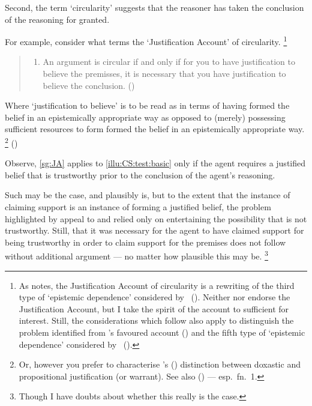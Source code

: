 \begin{note}
  Second, the term `circularity' suggests that the reasoner has taken the conclusion of the reasoning for granted.

  For example, consider what \citeauthor{Sgaravatti:2013wu} terms the `Justification Account' of circularity.\nolinebreak
  \footnote{
    As \citeauthor{Sgaravatti:2013wu} notes, the Justification Account of circularity is a rewriting of the third type of `epistemic dependence' considered by \citeauthor{Pryor:2004ws}~(\citeyear[359]{Pryor:2004ws}).
    Neither \citeauthor{Pryor:2004ws} nor \citeauthor{Sgaravatti:2013wu} endorse the Justification Account, but I take the spirit of the account to sufficient for interest.
    Still, the considerations which follow also apply to distinguish the {\color{red} problem identified} from \citeauthor{Sgaravatti:2013wu}'s favoured account (\Citeyear[\S3]{Sgaravatti:2013wu}) and the fifth type of `epistemic dependence' considered by \citeauthor{Pryor:2004ws}~(\citeyear[359]{Pryor:2004ws}).
  }

  \begin{quote}
    \begin{enumerate}[label=(JA), ref=(JA)]
    \item\label{sg:JA} An argument is circular if and only if for you to have justification to believe the premisses, it is necessary that you have justification to believe the conclusion.\nolinebreak
      \mbox{}\hfill\mbox{(\Citeyear[754]{Sgaravatti:2013wu})}
    \end{enumerate}
  \end{quote}
  Where `justification to believe' is to be read as in terms of having formed the belief in an epistemically appropriate way as opposed to (merely) possessing sufficient resources to form formed the belief in an epistemically appropriate way.\nolinebreak
  \footnote{
    Or, however you prefer to characterise \citeauthor{Firth:1978vi}'s (\Citeyear{Firth:1978vi}) distinction between doxastic and propositional justification (or warrant).
    See also \citeauthor{Silva:2020aa} (\Citeyear{Silva:2020aa}) --- esp.\ fn.\ 1.
  }
  (\citeauthor[Cf.][754--755]{Sgaravatti:2013wu})

  Observe, \ref{sg:JA} applies to \autoref{illu:CS:test:basic} only if the agent requires a justified belief that  is trustworthy prior to the conclusion of the agent's reasoning.

  Such may be the case, and plausibly is, but to the extent that the instance of claiming support is an instance of forming a justified belief, the problem highlighted by appeal to \ideaS{} and \ideaCS{} relied only on entertaining the possibility that  is not trustworthy.
  Still, that it was necessary for the agent to have claimed support for  being trustworthy in order to claim support for the premises does not follow without additional argument --- no matter how plausible this may be.\nolinebreak
  \footnote{
    Though I have doubts about whether this really is the case.
  }


\end{note}
